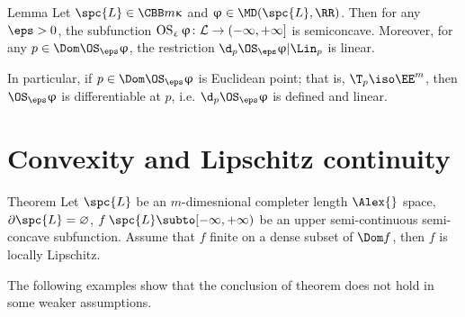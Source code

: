 \begin{thm}{Lemma}
Let $\spc{L}\in\CBB m\kappa$ and $\phi\in\MD(\spc{L},\RR)$.
Then for any $\eps>0$, the subfunction $\OS_\eps\phi\:\spc{L}\to(-\infty,+\infty]$ is semiconcave. 
Moreover, for any $p\in \Dom \OS_\eps\phi$, 
the restriction $\d_p\OS_\eps\phi|\Lin_p$ is linear.

In particular, if $p\in \Dom \OS_\eps\phi$ is Euclidean point; that is, $\T_p\iso\EE^m$, then $\OS_\eps\phi$ is differentiable at $p$, i.e. $\d_p\OS_\eps\phi$ is defined and linear.
\end{thm}














































\section{Convexity and Lipschitz continuity}

\begin{thm}{Theorem}\label{thm:cont=>lip}
Let $\spc{L}$ be an $m$-dimesnional completer length $\Alex{}$ space,
$\partial \spc{L}=\emptyset$,
$f\:\spc{L}\subto[-\infty,+\infty)$ be an upper semi-continuous semi-concave subfunction.
Assume that $f$ finite on a dense subset of $\Dom f$,
then $f$ is locally Lipschitz.
\end{thm}

The following examples show that the conclusion of theorem does not hold in some weaker assumptions.

